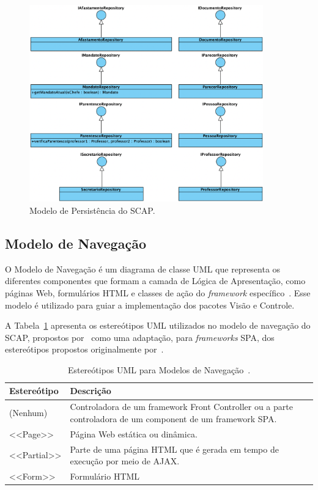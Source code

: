\begin{figure}[h!]
    \centering
    \includegraphics[width=0.9\textwidth]{figuras/fig-modelo-persist.png}
    \caption{Modelo de Persistência do SCAP.}
    \label{fig-modelo-persist}
\end{figure}



\subsection{Modelo de Navegação}
\label{subsec-frameweb-navegacao}

O Modelo de Navegação é um diagrama de classe UML que representa os diferentes componentes que
formam a camada de Lógica de Apresentação, como páginas Web, formulários HTML e classes de ação do \textit{framework} específico~\cite{souza:2007}. 
Esse modelo é utilizado para guiar a implementação dos pacotes Visão e Controle.

A Tabela~\ref{tab-estereotipos-navegacao} apresenta os estereótipos UML utilizados no modelo de navegação do SCAP,
propostos por~ como uma adaptação, para \textit{frameworks} SPA,
dos estereótipos propostos originalmente por~.

\begin{table}[h!]
    \centering
    \caption{Estereótipos UML para Modelos de Navegação~\cite{hoppe:2023}.}
    \label{tab-estereotipos-navegacao}
    \begin{tabular}{|p{3cm}|p{12cm}|}
        \hline
        \textbf{Estereótipo} & \textbf{Descrição} \\
        \hline
        (Nenhum)    & Controladora de um framework Front Controller ou a parte controladora de um component de um framework SPA. \\
        \hline
        <<Page>>    & Página Web estática ou dinâmica. \\
        \hline
        <<Partial>> & Parte de uma página HTML que é gerada em tempo de execução por meio de AJAX. \\
        \hline
        <<Form>>    & Formulário HTML \\
        \hline
    \end{tabular}
\end{table}


